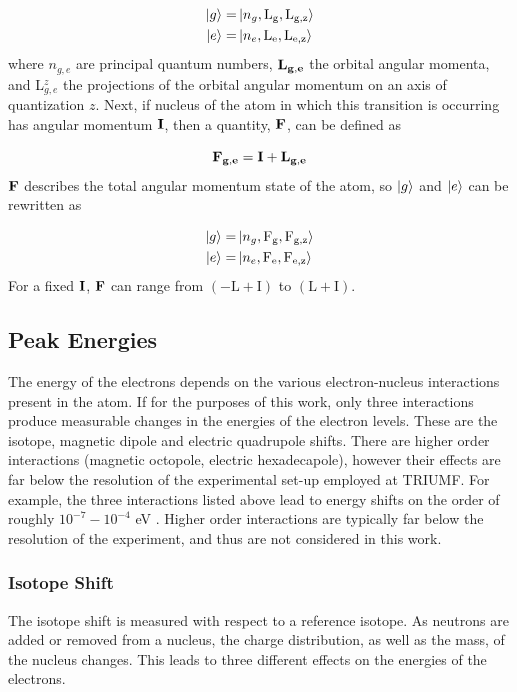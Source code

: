 \documentclass[12pt,a4paper,margin=1in]{report}
\begin{document}
\begin{align}
\ket{g} =& \ket{n_g,\mathrm{L_g,L_{g,z}}}\\
\ket{e} =& \ket{n_e,\mathrm{L_e,L_{e,z}}}
\end{align}
where $n_{g,e}$ are principal quantum numbers, $\bf{L_{g,e}}$ the orbital angular momenta, and L$_{g,e}^z$ the projections of the orbital angular momentum on an axis of quantization $z$. Next, if nucleus of the atom in which this transition is occurring has angular momentum $\bf{I}$, then a quantity, $\bf{F}$, can be defined as 

\begin{equation}
\bf{F_{g,e}} = \bf{I} + \bf{L_{g,e}}
\end{equation}
$\bf{F}$ describes the total angular momentum state of the atom, so $\ket{g}$ and $\ket{e}$ can be rewritten as

\begin{align}
\ket{g} =& \ket{n_g,\mathrm{F_g, F_{g,z}}}\\
\ket{e} =& \ket{n_e,\mathrm{F_e, F_{e,z}}}
\end{align}
For a fixed $\bf{I}$, $\bf{F}$ can range from $(-\mathrm{L+I})$ to $(\mathrm{L+I})$.
\subsection{Peak Energies}
The energy of the electrons depends on the various electron-nucleus interactions present in the atom. If for the purposes of this work, only three interactions produce measurable changes in the energies of the electron levels. These are the isotope, magnetic dipole and electric quadrupole shifts. There are higher order interactions (magnetic octopole, electric hexadecapole), however their effects are far below the resolution of the experimental set-up employed at TRIUMF. For example, the three interactions listed above lead to energy shifts on the order of roughly $10^{-7}-10^{-4}$ eV \cite{ModAN}. Higher order interactions are typically far below the resolution of the experiment, and thus are not considered in this work. 

\subsubsection*{Isotope Shift}
The isotope shift is measured with respect to a reference isotope. As neutrons are added or removed from a nucleus, the charge distribution, as well as the mass, of the nucleus changes. This leads to three different effects on the energies of the electrons. 
\end{document}
